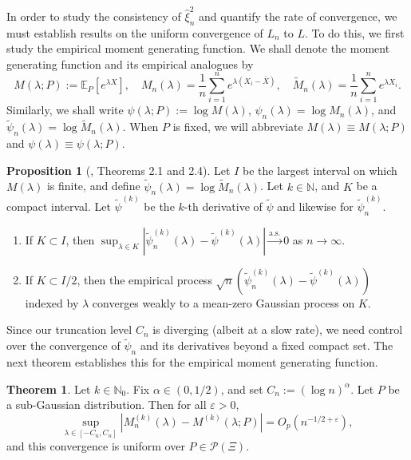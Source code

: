 \documentclass{article}
\theoremstyle{definition}
\newtheorem{theorem}{Theorem}
\newtheorem{proposition}{Proposition}
\newcommand*\eps{\epsilon}
\renewcommand*\epsilon{\varepsilon}
\newcommand{\N}{\mathbb{N}}
\newcommand{\E}{\mathbb{E}}
\newcommand{\1}{\mathbbm{1}}
\begin{document}
In order to study the consistency of $\hat \xi^2_n$ and quantify the rate of convergence, we must establish results on the uniform convergence of $L_n$ to $L$. To do this, we first study the empirical moment generating function. We shall denote the moment generating function and its empirical analogues by  
\[
M(\lambda; P) := \E_P[e^{\lambda X}], \quad M_n(\lambda) = \frac1n\sum_{i=1}^n e^{\lambda (X_i - \bar X)}, \quad \tilde M_n(\lambda) = \frac1n\sum_{i=1}^n e^{\lambda X_i}. 
\]
Similarly, we shall write $\psi(\lambda; P) := \log M(\lambda)$, $\psi_n(\lambda) = \log M_n(\lambda)$, and $\tilde \psi_n(\lambda) = \log \tilde M_n(\lambda)$. When $P$ is fixed, we will abbreviate $M(\lambda) \equiv M(\lambda ; P)$ and $\psi(\lambda) \equiv \psi(\lambda; P)$.


\begin{proposition}[\cite{feuerverger1989empirical}, Theorems 2.1 and 2.4]
\label{prop:feuerverger-uniform-convergence}
    Let $I$ be the largest interval on which $M(\lambda)$ is finite, and define $\tilde \psi_n(\lambda) = \log \tilde M_n(\lambda)$. Let $k \in \N$, and $K$ be a compact interval. Let $\tilde{\psi}^{(k)}$ be the $k$-th derivative of $\tilde{\psi}$ and likewise for $\tilde{\psi}_n^{(k)}$. 
    \begin{enumerate}
        \item[(a)] If $K\subset I$, then  $\sup_{\lambda \in K} |\tilde \psi_n^{(k)}(\lambda) - \tilde \psi^{(k)}(\lambda)| \xrightarrow{\mathrm{a.s.}} 0$ as $n \to \infty$. 
        \item[(b)] If $K \subset I/2$, then the empirical process $\sqrt n(\tilde \psi_n^{(k)}(\lambda) - \tilde \psi^{(k)}(\lambda))$ indexed by $\lambda$ converges weakly to a mean-zero Gaussian process on $K$. 
    \end{enumerate}
\end{proposition}
Since our truncation level $C_n$ is diverging (albeit at a slow rate), we need control over the convergence of $\tilde \psi_n$ and its derivatives beyond a fixed compact set. The next theorem establishes this for the empirical moment generating function.
\begin{theorem}
\label{prop:sub-gaussian-convergence-lemma}
    Let $k \in \N_0$.
    Fix $\alpha \in (0, 1/2)$, and set $C_n := (\log n)^\alpha$. Let $P$ be a sub-Gaussian distribution. Then for all $\eps > 0$,
    \[
    \sup_{\lambda \in [-C_n, C_n]} |M_n^{(k)}(\lambda) - M^{(k)}(\lambda; P)| = O_p(n^{-1/2 + \eps}),
    \]
    and this convergence is uniform over $P \in \mathcal P(\Xi)$. 
\end{theorem}
\end{document}
